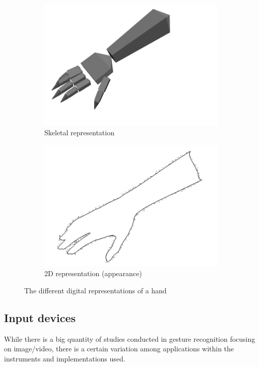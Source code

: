 \documentclass[12pt,a4paper,twoside]{report}
\begin{document}
\begin{figure}[h]
\begin{subfigure}{0.45\linewidth}
      \includegraphics[width=\linewidth]{img/Algorithms_hand_skeletal.png}
      \caption{Skeletal representation}  
    \end{subfigure}
    \begin{subfigure}{0.45\linewidth}
      \includegraphics[width=\linewidth]{img/Algorithms_hand_2d.png}
      \caption{2D representation (appearance)}  
    \end{subfigure}  
  \caption{The different digital representations of a hand}
  \label{mfig:hands}
\end{figure}

\subsection{Input devices}
While there is a big quantity of studies conducted in gesture recognition focusing on image/video, there is a certain variation among applications within the instruments and implementations used.
\end{document}
